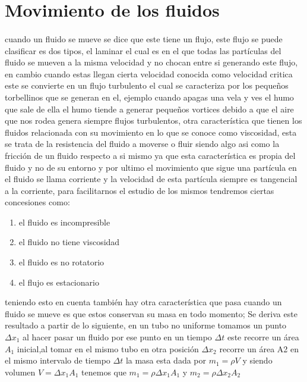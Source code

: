 \documentclass{article}
\begin{document}
\section*{Movimiento de los fluidos }
\paragraph*{}
cuando un fluido se mueve se dice que este tiene un flujo, este flujo se puede clasificar es dos tipos, el laminar el cual es en el que todas las 
partículas del fluido se mueven a la misma velocidad y no chocan entre si generando este flujo, en cambio cuando estas llegan cierta velocidad conocida 
como velocidad critica este se convierte en un flujo turbulento el cual se caracteriza por los pequeños torbellinos que se generan en el,
ejemplo cuando apagas una vela y ves el humo que sale de ella el humo tiende a generar pequeños vortices debido a que el aire que nos rodea genera 
siempre flujos turbulentos, otra característica que tienen los fluidos relacionada con su movimiento en lo que se conoce como viscosidad, esta se trata de 
la resistencia del fluido a moverse o fluir siendo algo asi como la fricción de un fluido respecto a si mismo ya que esta característica
es propia del fluido y no de su entorno y por ultimo el movimiento que sigue una partícula en el fluido se llama corriente y la velocidad de esta partícula siempre es
tangencial a la corriente, para facilitarnos el estudio de los mismos tendremos ciertas concesiones como:\\
\begin{enumerate}
    \item el fluido es incompresible
    \item el fluido no tiene viscosidad
    \item el fluido es no rotatorio
    \item el flujo es estacionario
\end{enumerate}
teniendo esto en cuenta también hay otra característica que pasa cuando un fluido se mueve es que estos conservan su masa en todo momento;
Se deriva este resultado a partir de lo siguiente, en un tubo no uniforme tomamos un punto $\Delta {x}_{1}$ al hacer pasar un fluido por ese punto en un tiempo $\Delta t$
este recorre un  área ${A}_1$ inicial,al tomar en el mismo tubo en otra posición $\Delta {x}_{2}$ recorre un área A2 en el mismo intervalo de tiempo $\Delta t$
la masa esta dada por ${m}_{1}=\rho V$ y siendo volumen $V=\Delta {x}_{1} {A}_{1}$ tenemos que ${m}_{1}=\rho \Delta {x}_{1} {A}_{1}$ y ${m}_{2}=\rho \Delta {x}_{2} {A}_{2}$
\end{document}
